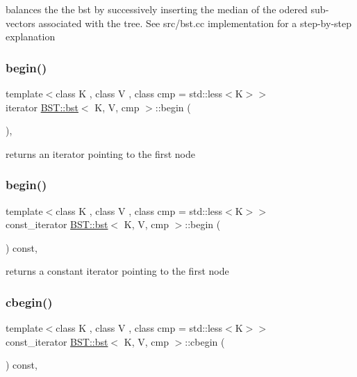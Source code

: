 balances the the bst by successively inserting the median of the odered sub-\/vectors associated with the tree. See src/bst.\+cc implementation for a step-\/by-\/step explanation \mbox{\label{classBST_1_1bst_a998e86071c043c562ac906197cbf015e}} 
\subsubsection{\texorpdfstring{begin()}{begin()}\hspace{0.1cm}{\footnotesize\ttfamily [1/2]}}
{\footnotesize\ttfamily template$<$class K , class V , class cmp  = std\+::less$<$\+K$>$$>$ \\
iterator \hyperlink{classBST_1_1bst}{B\+S\+T\+::bst}$<$ K, V, cmp $>$\+::begin (\begin{DoxyParamCaption}{ }\end{DoxyParamCaption})\hspace{0.3cm}{\ttfamily [inline]}, {\ttfamily [noexcept]}}

returns an iterator pointing to the first node \mbox{\label{classBST_1_1bst_a09b9837132cc0a911be4409bab8ab56f}} 
\subsubsection{\texorpdfstring{begin()}{begin()}\hspace{0.1cm}{\footnotesize\ttfamily [2/2]}}
{\footnotesize\ttfamily template$<$class K , class V , class cmp  = std\+::less$<$\+K$>$$>$ \\
const\+\_\+iterator \hyperlink{classBST_1_1bst}{B\+S\+T\+::bst}$<$ K, V, cmp $>$\+::begin (\begin{DoxyParamCaption}{ }\end{DoxyParamCaption}) const\hspace{0.3cm}{\ttfamily [inline]}, {\ttfamily [noexcept]}}

returns a constant iterator pointing to the first node \mbox{\label{classBST_1_1bst_aeb386c648e83761a52fe4ff1ac493463}} 
\subsubsection{\texorpdfstring{cbegin()}{cbegin()}}
{\footnotesize\ttfamily template$<$class K , class V , class cmp  = std\+::less$<$\+K$>$$>$ \\
const\+\_\+iterator \hyperlink{classBST_1_1bst}{B\+S\+T\+::bst}$<$ K, V, cmp $>$\+::cbegin (\begin{DoxyParamCaption}{ }\end{DoxyParamCaption}) const\hspace{0.3cm}{\ttfamily [inline]}, {\ttfamily [noexcept]}}

